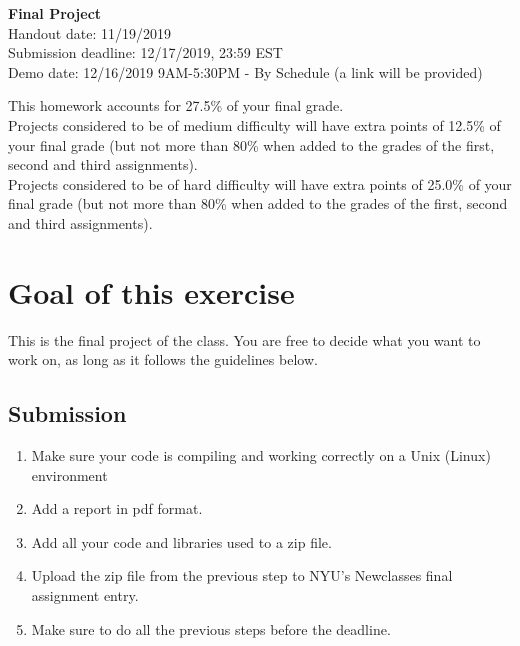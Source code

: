 \documentclass[11pt]{article}
\begin{document}
\hspace{50pt}

\begin{center}

{\Huge \textbf{Final Project}}\\
\vspace{10pt}
Handout date: 11/19/2019\\
Submission deadline: 12/17/2019,  23:59 EST\\
Demo date: 12/16/2019 9AM-5:30PM - By Schedule (a link will be provided)
\end{center}

\noindent This homework accounts for 27.5\% of your final grade.\\
\noindent Projects considered to be of medium difficulty will have extra points of 12.5\% of your final grade (but not more than 80\% when added to the grades of the first, second and third assignments).\\
\noindent Projects considered to be of hard difficulty will have extra points of 25.0\% of your final grade (but not more than 80\% when added to the grades of the first, second and third assignments).
 

\section*{Goal of this exercise}
This is the final project of the class. You are free to decide what you want to work on, as long as it follows the guidelines below.

\subsection*{Submission}

\begin{enumerate}
\item Make sure your code is compiling and working correctly on a Unix (Linux) environment
\item Add a report in pdf format.
\item Add all your code and libraries used to a zip file. 
\item Upload the zip file from the previous step to NYU's Newclasses final assignment entry.
\item Make sure to do all the previous steps before the deadline.

\end{enumerate}
\end{document}
